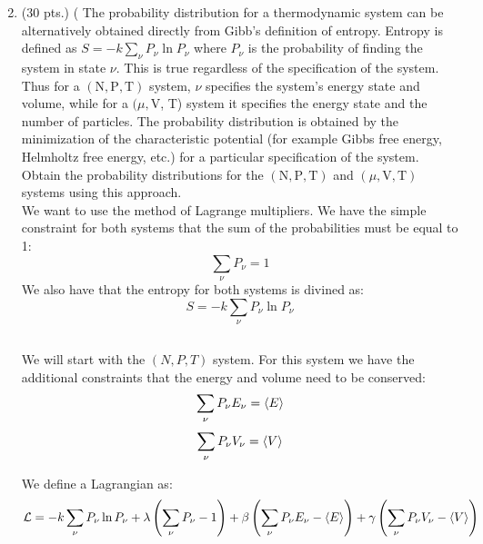 \documentclass[10pt]{article}
\begin{document}
\begin{enumerate}
  \setcounter{enumi}{1}
  \item (30 pts.) ( The probability distribution for a thermodynamic system can be alternatively obtained directly from Gibb's definition of entropy. Entropy is defined as $S=-k \sum_{\nu} P_{\nu} \ln P_{\nu}$ where $P_{\nu}$ is the probability of finding the system in state $\nu$. This is true regardless of the specification of the system. Thus for a $(\mathrm{N}, \mathrm{P}, \mathrm{T})$ system, $\nu$ specifies the system's energy state and volume, while for a $(\mu, \mathrm{V}$, T) system it specifies the energy state and the number of particles. The probability distribution is obtained by the minimization of the characteristic potential (for example Gibbs free energy, Helmholtz free energy, etc.) for a particular specification of the system. Obtain the probability distributions for the $(\mathrm{N}, \mathrm{P}, \mathrm{T})$ and $(\mu, \mathrm{V}, \mathrm{T})$ systems using this approach.
\\
We want to use the method of Lagrange multipliers. We have the simple constraint for both systems that the sum of the probabilities must be equal to 1:
\begin{equation}
  \sum_{\nu} P_{\nu} = 1
\end{equation}
We also have that the entropy for both systems is divined as:
\begin{equation}
  S = - k \sum_{\nu} P_{\nu} \ln P_{\nu}
\end{equation}
\subsection{}
We will start with the $(N,P,T)$ system. For this system we have the additional constraints that the energy and volume need to be conserved:
\begin{equation}
  \sum_{\nu} P_{\nu} E_{\nu} = \expval{E}
\end{equation}
\begin{equation}
  \sum_{\nu} P_{\nu} V_{\nu} = \expval{V}
\end{equation}

We define a Lagrangian as:
\begin{equation}
  \mathcal{L} = - k \sum_{\nu} P_{\nu} \ln P_{\nu} + \lambda \left( \sum_{\nu} P_{\nu} - 1 \right) + \beta \left( \sum_{\nu} P_{\nu} E_{\nu} - \expval{E} \right) + \gamma \left( \sum_{\nu} P_{\nu} V_{\nu} - \expval{V} \right)
\end{equation}

\end{enumerate}
\end{document}
